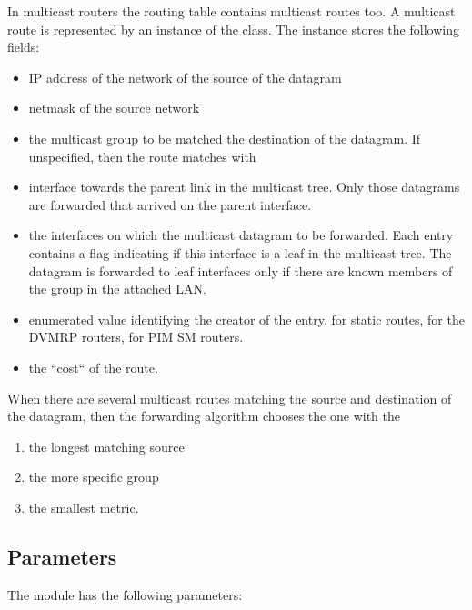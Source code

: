 In multicast routers the routing table contains multicast routes too.
A multicast route is represented by an instance of the 
class. The  instance stores the following fields:
\begin{itemize}
  \item {} IP address of the network of the source of the datagram
  \item {} netmask of the source network
  \item {} the multicast group to be matched the destination of the
  datagram. If unspecified, then the route matches with
  \item {} interface towards the parent link in the multicast tree.
  Only those datagrams are forwarded that arrived on the parent interface.
  \item {} the interfaces on which the multicast datagram to be forwarded.
  Each entry contains a flag indicating if this interface is a leaf in the multicast
  tree. The datagram is forwarded to leaf interfaces only if there are known members
  of the group in the attached LAN.
  \item {} enumerated value identifying the creator of the entry. 
  for static routes,  for the DVMRP routers,  for PIM SM routers.
  \item {} the ``cost`` of the route.
\end{itemize}

When there are several multicast routes matching the source and destination
of the datagram, then the forwarding algorithm chooses the one with the
\begin{enumerate}
  \item the longest matching source
  \item the more specific group
  \item the smallest metric.
\end{enumerate}

\subsection*{Parameters}

The  module has the following parameters:

